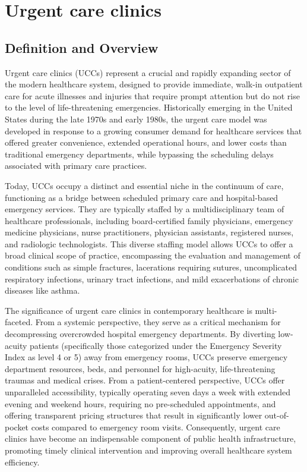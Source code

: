 \chapter{Urgent care clinics}

\section*{Definition and Overview}
Urgent care clinics (UCCs) represent a crucial and rapidly expanding sector of the modern healthcare system, designed to provide immediate, walk-in outpatient care for acute illnesses and injuries that require prompt attention but do not rise to the level of life-threatening emergencies. Historically emerging in the United States during the late 1970s and early 1980s, the urgent care model was developed in response to a growing consumer demand for healthcare services that offered greater convenience, extended operational hours, and lower costs than traditional emergency departments, while bypassing the scheduling delays associated with primary care practices.

Today, UCCs occupy a distinct and essential niche in the continuum of care, functioning as a bridge between scheduled primary care and hospital-based emergency services. They are typically staffed by a multidisciplinary team of healthcare professionals, including board-certified family physicians, emergency medicine physicians, nurse practitioners, physician assistants, registered nurses, and radiologic technologists. This diverse staffing model allows UCCs to offer a broad clinical scope of practice, encompassing the evaluation and management of conditions such as simple fractures, lacerations requiring sutures, uncomplicated respiratory infections, urinary tract infections, and mild exacerbations of chronic diseases like asthma.

The significance of urgent care clinics in contemporary healthcare is multi-faceted. From a systemic perspective, they serve as a critical mechanism for decompressing overcrowded hospital emergency departments. By diverting low-acuity patients (specifically those categorized under the Emergency Severity Index as level 4 or 5) away from emergency rooms, UCCs preserve emergency department resources, beds, and personnel for high-acuity, life-threatening traumas and medical crises. From a patient-centered perspective, UCCs offer unparalleled accessibility, typically operating seven days a week with extended evening and weekend hours, requiring no pre-scheduled appointments, and offering transparent pricing structures that result in significantly lower out-of-pocket costs compared to emergency room visits. Consequently, urgent care clinics have become an indispensable component of public health infrastructure, promoting timely clinical intervention and improving overall healthcare system efficiency.

